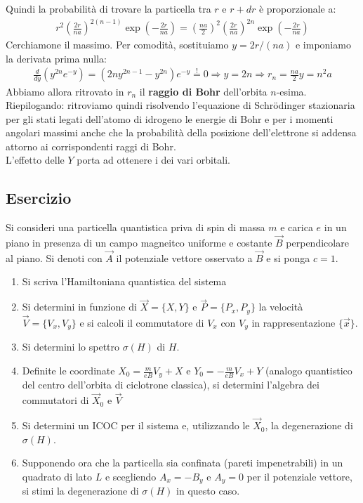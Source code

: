 \documentclass[../../FisicaTeorica.tex]{subfiles}
\begin{document}
Quindi la probabilità di trovare la particella tra $r$ e $r+dr$ è proporzionale a:
\begin{align*}
r^2 \left(\frac{2r}{na}\right)^{2(n-1)}\exp\left(-\frac{2r}{na}\right) =\left(\frac{na}{2}\right)^2 \left(\frac{2r}{na}\right)^{2n} \exp\left(-\frac{2r}{na}\right)
\end{align*}
Cerchiamone il massimo. Per comodità, sostituiamo $y=2r/(na)$ e imponiamo la derivata prima nulla:
\begin{align*}
\frac{d}{dy}\left( y^{2n} e^{-y} \right) = \left(
2n y^{2n-1} - y^{2n}
\right) e^{-y} \overset{!}{=} 0 \Rightarrow  y=2n \Rightarrow r_n = \frac{na}{2}y = n^2 a
\end{align*}
Abbiamo allora ritrovato in $r_n$ il \textbf{raggio di Bohr} dell'orbita $n$-esima.\\

Riepilogando: ritroviamo quindi risolvendo l'equazione di Schr\"odinger stazionaria per gli stati legati dell'atomo di idrogeno le energie di Bohr e per i momenti angolari massimi anche che la probabilità della posizione dell'elettrone si addensa attorno ai corrispondenti raggi di Bohr.\\

L'effetto delle $Y$ porta ad ottenere i  dei vari orbitali.

\subsection{Esercizio}
Si consideri una particella quantistica priva di spin di massa $m$ e carica $e$ in un piano in presenza di un campo magneitco uniforme e costante $\vec{B}$ perpendicolare al piano. Si denoti con $\vec{A}$ il potenziale vettore osservato a $\vec{B}$ e si ponga $c=1$.
\begin{enumerate}
\item Si scriva l'Hamiltoniana quantistica del sistema
\item Si determini in funzione di $\vec{X}=\{X,Y\}$ e $\vec{P}= \{P_x, P_y\}$ la velocità $\vec{V}=\{V_x, V_y\}$ e si calcoli il commutatore di $V_x$ con $V_y$ in rappresentazione $\{\vec{x}\}$.
\item Si determini lo spettro $\sigma(H)$ di $H$.
\item Definite le coordinate $X_0=\frac{m}{eB}V_y + X$ e $Y_0 = -\frac{m}{eB}V_x + Y$ (analogo quantistico del centro dell'orbita di ciclotrone classica), si determini l'algebra dei commutatori di $\vec{X}_0$ e $\vec{V}$
\item Si determini un ICOC per il sistema e, utilizzando le $\vec{X}_0$, la degenerazione di $\sigma(H)$.
\item Supponendo ora che la particella sia confinata (pareti impenetrabili) in un quadrato di lato $L$ e scegliendo
$A_x = -B_y$ e $A_y=0$ per il potenziale vettore, si stimi la degenerazione di $\sigma(H)$ in questo caso.
\end{enumerate}
\end{document}
